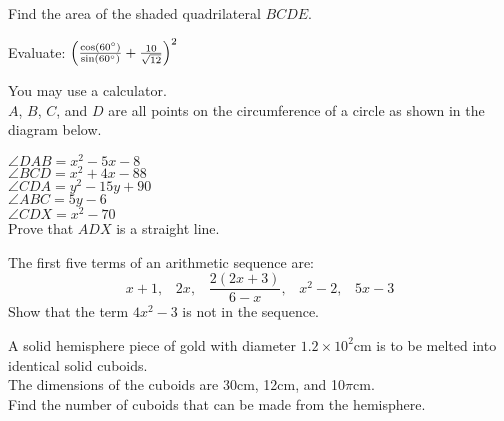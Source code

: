 \documentclass{exam}
\begin{document}
\begin{questions}
    Find the area of the shaded quadrilateral $BCDE$.
    \newpage

    \question Evaluate: $\Big( \frac{\cos(60\degree)}{\sin(60\degree)} + \frac{10}{\sqrt{12}} \Big)^2$
    \newpage

    \question You may use a calculator.\\
    $A$, $B$, $C$, and $D$ are all points on the circumference of a circle as shown in the diagram below.\\
    \begin{minipage}{0.4\textwidth}
    \end{minipage}
    \begin{minipage}{0.4\textwidth}
    $\angle DAB = x^2-5x-8$\\
    $\angle BCD = x^2+4x-88$\\
    $\angle CDA = y^2-15y+90$\\
    $\angle ABC = 5y-6$\\
    $\angle CDX = x^2-70$\\
    Prove that $ADX$ is a straight line.
    \end{minipage}
    \newpage

    \question The first five terms of an arithmetic sequence are:\\
    \begin{equation*}
        x+1 \textrm{,} \quad 2x \textrm{,} \quad \frac{2(2x+3)}{6-x} \textrm{,} \quad x^2-2 \textrm{,} \quad 5x-3
    \end{equation*}
    Show that the term $4x^2-3$ is not in the sequence.
    \newpage
    
    \question A solid hemisphere piece of gold with diameter $1.2\times 10^2$cm is to be melted into identical solid cuboids.\\
    The dimensions of the cuboids are 30cm, 12cm, and 10$\pi$cm.\\
    Find the number of cuboids that can be made from the hemisphere.
    \newpage


\end{questions}
\end{document}
